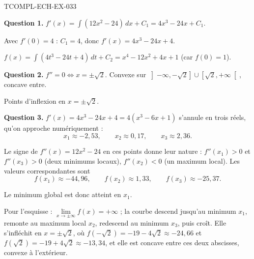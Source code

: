 \begin{corrige}{TCOMPL-ECH-EX-033}

\textbf{Question 1.} $f'(x) = \int (12x^2 - 24)\,dx + C_1 = 4x^3 - 24x + C_1$.

Avec $f'(0) = 4$ : $C_1 = 4$, donc $f'(x) = 4x^3 - 24x + 4$.


$f(x) = \int (4t^3 - 24t + 4)\,dt + C_2 = x^4 - 12x^2 + 4x + 1$ (car $f(0) = 1$).

\textbf{Question 2.} $f'' = 0 \iff x = \pm\sqrt{2}$. Convexe sur $\left]-\infty,-\sqrt2\right] \cup \left[\sqrt2,+\infty\right[$, concave entre.

Points d'inflexion en $x = \pm\sqrt{2}$.

\textbf{Question 3.} $f'(x) = 4x^3 - 24x + 4 = 4(x^3 - 6x + 1)$ s'annule en trois
réels, qu'on approche numériquement :
\[ x_1 \approx -2{,}53, \qquad x_2 \approx 0{,}17, \qquad x_3 \approx 2{,}36. \]

Le signe de $f''(x) = 12x^2 - 24$ en ces points donne leur nature :
$f''(x_1) > 0$ et $f''(x_3) > 0$ (deux minimums locaux), $f''(x_2) < 0$ (un
maximum local). Les valeurs correspondantes sont
\[ f(x_1) \approx -44{,}96, \qquad f(x_2) \approx 1{,}33, \qquad f(x_3) \approx -25{,}37. \]

Le minimum global est donc atteint en $x_1$.

Pour l'esquisse : $\lim\limits_{x\to\pm\infty} f(x) = +\infty$ ; la courbe descend
jusqu'au minimum $x_1$, remonte au maximum local $x_2$, redescend au minimum
$x_3$, puis croît. Elle s'infléchit en $x=\pm\sqrt2$, où
$f(-\sqrt2) = -19-4\sqrt2 \approx -24{,}66$ et $f(\sqrt2) = -19+4\sqrt2 \approx -13{,}34$,
et elle est concave entre ces deux abscisses, convexe à l'extérieur.

\end{corrige}
